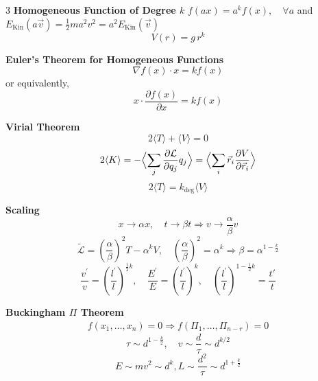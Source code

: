 \documentclass[1pt]{article}
\begin{document}
\begin{multicols}{3}
\textbf{Homogeneous Function of Degree \( k \)}
\( f(a x) = a^k f(x), \quad \forall a \) \quad and \quad \( E_\text{Kin}(a\vec{v})=\frac{1}{2}ma^2v^2=a^2E_\text{Kin}(\vec{v}) \)
\begin{equation*}
    V(r)=g\, r^k 
\end{equation*}

\textbf{Euler’s Theorem for Homogeneous Functions}
\begin{equation*}
    \nabla f(x) \cdot x = k f(x)
\end{equation*}
or equivalently,
\begin{equation*}
    x \cdot \frac{\partial f(x)}{\partial x} = k f(x)
\end{equation*}

\textbf{Virial Theorem}
\begin{equation*}
    2 \langle T \rangle + \langle V \rangle = 0
\end{equation*}
\begin{equation*}
    2\langle K \rangle = -\Bigl\langle \sum_j \frac{\partial \mathcal{L}}{\partial q_j} q_j \Bigr\rangle = \Bigl\langle \sum_i \vec{r}_i \frac{\partial V}{\partial \vec{r}_i} \Bigr\rangle
\end{equation*}
\[ 2\langle T\rangle = k_{\text{deg}}\langle V\rangle \]

\textbf{Scaling}
\[
x\rightarrow\alpha x,\quad t\rightarrow\beta t \Rightarrow v\rightarrow\frac{\alpha}{\beta}v
\]
\[
\tilde{\mathcal{L}}=\left(\frac{\alpha}{\beta}\right)^{2}T-\alpha^{k}V,\quad \left(\frac{\alpha}{\beta}\right)^{2}=\alpha^{k}\Rightarrow\beta=\alpha^{1-\frac{k}{2}}
\]
\begin{equation*}
    \frac{v^{\prime}}{v}=\left(\frac{l^{\prime}}{l}\right)^{\frac{1}{2} k},\quad \frac{E^{\prime}}{E}=\left(\frac{l^{\prime}}{l}\right)^k,\quad \left(\frac{l^{\prime}}{l}\right)^{1-\frac{1}{2}k}=\frac{t'}{t}
\end{equation*}

\textbf{Buckingham \(\Pi\) Theorem}
\begin{align*}
        f(x_1, \ldots, x_n) = 0 \Rightarrow f(\Pi_1, \ldots, \Pi_{n-r}) = 0
\end{align*}
\begin{equation*}
    \tau \sim d^{1 - \frac{k}{2}}, \quad v \sim \frac{d}{\tau} \sim d^{k/2}
\end{equation*}
\begin{equation*}
    E \sim m v^2 \sim d^k ,L \sim \frac{d^2}{\tau} \sim d^{1 + \frac{k}{2}}
\end{equation*}


\end{multicols}
\end{document}
